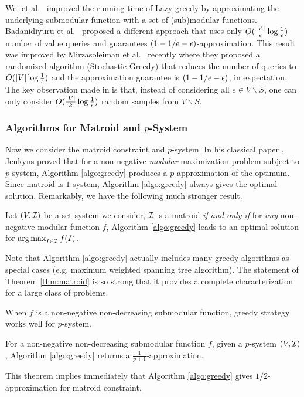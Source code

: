 Wei et al.\ \cite{WIB14} improved the running time of {\sc Lazy-greedy} by approximating the underlying submodular function with a set of (sub)modular functions. Badanidiyuru et al.\ \cite{BV14} proposed a different approach that uses only $O(\frac{|V|}{\epsilon}\log \frac{1}{\epsilon})$ number of value queries and guarantees $(1 - 1/e - \epsilon)$-approximation. This result was improved by Mirzasoleiman et al.\ \cite{MBK+15} recently where they proposed a randomized algorithm ({\sc Stochastic-Greedy}) that reduces the number of queries to  $O(|V| \log \frac{1}{\epsilon})$ and the approximation guarantee is $(1 - 1/e - \epsilon)$, in expectation. The key observation made in \cite{MBK+15} is that, instead of considering all $e\in V\backslash S$, one can only consider $O(\frac{|V|}{k}\log \frac{1}{\epsilon})$  random samples from $V\backslash S$. 



 







\subsubsection{Algorithms for Matroid and $p$-System}
Now we consider the matroid constraint and $p$-system. In his classical paper \cite{J76}, Jenkyns proved that for a non-negative \emph{modular} maximization problem subject to $p$-system, Algorithm \ref{algo:greedy} produces a $p$-approximation of the optimum. Since matroid is $1$-system, Algorithm \ref{algo:greedy} always gives the optimal solution. Remarkably, we have the following much stronger result. 

\begin{theorem}
  \label{thm:matroid}
  Let $(V, \mathcal{I})$ be a set system we consider, $\mathcal{I}$ is a matroid \emph{if and only if} for \emph{any} non-negative modular function $f$, Algorithm \ref{algo:greedy} leads to an optimal solution for $\operatorname*{arg\,max}_{I\in \mathcal{I}} f(I)$.
\end{theorem}
Note that Algorithm \ref{algo:greedy} actually includes many greedy algorithms as special cases (e.g. maximum weighted spanning tree algorithm). The statement of Theorem \ref{thm:matroid} is so strong that it provides a complete  characterization for a large class of problems.

When $f$ is a non-negative non-decreasing submodular function, greedy strategy works well for $p$-system.
\begin{theorem}
  \label{thm:}
  For a non-negative non-decreasing submodular function $f$, given a $p$-system $(V, \mathcal{I})$, Algorithm \ref{algo:greedy} returns a $\frac{1}{p + 1}$-approximation.
\end{theorem}
This theorem implies immediately that Algorithm \ref{algo:greedy} gives $1/2$-approximation for matroid constraint. 

